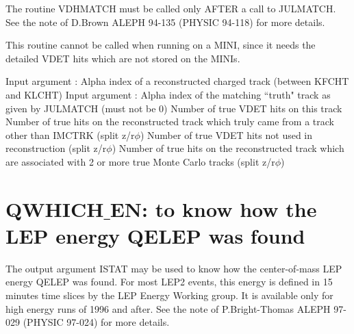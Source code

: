  
     The routine VDHMATCH must be called only AFTER a call to JULMATCH.
                             See the note of D.Brown ALEPH 94-135 (PHYSIC 94-118) for more details.
 
     This routine cannot be called when running on a MINI, since it needs the detailed VDET hits
which are not stored on the MINIs.
 
\begin{indentlist}{ 3.50cm}{ 3.75cm}
      Input argument :   Alpha index of a reconstructed charged track (between KFCHT and KLCHT)
      Input argument :   Alpha index of the matching ``truth"  track as given by JULMATCH
                         (must not be 0)
   Number of true VDET hits on this track
   Number of true hits on the reconstructed track which truly came from a track other than IMCTRK
                      (split z/r$\phi$)
   Number of true VDET hits not used in reconstruction (split z/r$\phi$)
  Number of true hits on the reconstructed track which
                      are associated with 2 or more true Monte Carlo tracks (split z/r$\phi$)
\end{indentlist}
 
\par
\section{\label{sec-ELEP2}QWHICH$\_$EN: to know how the LEP energy QELEP was found}
\par
{}
\par
 
 
     The output argument ISTAT may be used to know how the  center-of-mass LEP energy QELEP was found.
     For most LEP2 events, this energy is defined in 15 minutes time slices by the
     LEP Energy Working group. It is available only for high energy runs of 1996 and after.
                             See the note of P.Bright-Thomas ALEPH 97-029 (PHYSIC 97-024) for more details.
 
